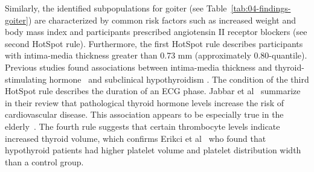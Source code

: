 \documentclass[
  oneside]{book}
\begin{document}
Similarly, the identified subpopulations for goiter (see Table~\ref{tab:04-findings-goiter}) are characterized by common risk factors such as increased weight and body mass index and participants prescribed angiotensin II receptor blockers (see second HotSpot rule).
Furthermore, the first HotSpot rule describes participants with intima-media thickness greater than 0.73 mm (approximately 0.80-quantile).
Previous studies found associations between intima-media thickness and thyroid-stimulating hormone~\autocite{takamura2009thyroid} and subclinical hypothyroidism
\autocite{gao2013carotid,unal2017association}.
The condition of the third HotSpot rule describes the duration of an ECG phase.
Jabbar et al~\autocite{jabbar2017thyroid} summarize in their review that pathological thyroid hormone levels increase the risk of cardiovascular disease.
This association appears to be especially true in the elderly~\autocite{fazio2004effects}.
The fourth rule suggests that certain thrombocyte levels indicate increased thyroid volume, which confirms Erikci et al~\autocite{erikci2009effect} who found that hypothyroid patients had higher platelet volume and platelet distribution width than a control group.
\end{document}
